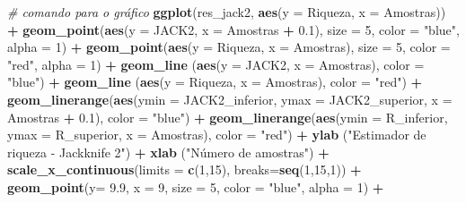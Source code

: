 \documentclass[
]{book}
\newenvironment{Shaded}{\begin{snugshade}}{\end{snugshade}}
\newcommand{\CommentTok}[1]{\textcolor[rgb]{0.56,0.35,0.01}{\textit{#1}}}
\newcommand{\DataTypeTok}[1]{\textcolor[rgb]{0.13,0.29,0.53}{#1}}
\newcommand{\DecValTok}[1]{\textcolor[rgb]{0.00,0.00,0.81}{#1}}
\newcommand{\FloatTok}[1]{\textcolor[rgb]{0.00,0.00,0.81}{#1}}
\newcommand{\KeywordTok}[1]{\textcolor[rgb]{0.13,0.29,0.53}{\textbf{#1}}}
\newcommand{\NormalTok}[1]{#1}
\newcommand{\OperatorTok}[1]{\textcolor[rgb]{0.81,0.36,0.00}{\textbf{#1}}}
\newcommand{\StringTok}[1]{\textcolor[rgb]{0.31,0.60,0.02}{#1}}
\begin{document}
\begin{Shaded}
\begin{Highlighting}[]
\CommentTok{# comando para o gráfico}
\KeywordTok{ggplot}\NormalTok{(res_jack2, }\KeywordTok{aes}\NormalTok{(}\DataTypeTok{y =}\NormalTok{ Riqueza, }\DataTypeTok{x =}\NormalTok{ Amostras)) }\OperatorTok{+}
\StringTok{  }\KeywordTok{geom_point}\NormalTok{(}\KeywordTok{aes}\NormalTok{(}\DataTypeTok{y =}\NormalTok{ JACK2, }\DataTypeTok{x =}\NormalTok{ Amostras }\OperatorTok{+}\StringTok{ }\FloatTok{0.1}\NormalTok{), }\DataTypeTok{size =} \DecValTok{5}\NormalTok{, }\DataTypeTok{color =} \StringTok{"blue"}\NormalTok{, }\DataTypeTok{alpha =} \DecValTok{1}\NormalTok{) }\OperatorTok{+}
\StringTok{  }\KeywordTok{geom_point}\NormalTok{(}\KeywordTok{aes}\NormalTok{(}\DataTypeTok{y =}\NormalTok{ Riqueza, }\DataTypeTok{x =}\NormalTok{ Amostras), }\DataTypeTok{size =} \DecValTok{5}\NormalTok{, }\DataTypeTok{color =} \StringTok{"red"}\NormalTok{, }\DataTypeTok{alpha =} \DecValTok{1}\NormalTok{) }\OperatorTok{+}
\StringTok{  }\KeywordTok{geom_line}\NormalTok{ (}\KeywordTok{aes}\NormalTok{(}\DataTypeTok{y =}\NormalTok{ JACK2, }\DataTypeTok{x =}\NormalTok{ Amostras), }\DataTypeTok{color =} \StringTok{"blue"}\NormalTok{) }\OperatorTok{+}
\StringTok{  }\KeywordTok{geom_line}\NormalTok{ (}\KeywordTok{aes}\NormalTok{(}\DataTypeTok{y =}\NormalTok{ Riqueza, }\DataTypeTok{x =}\NormalTok{ Amostras), }\DataTypeTok{color =} \StringTok{"red"}\NormalTok{) }\OperatorTok{+}
\StringTok{  }\KeywordTok{geom_linerange}\NormalTok{(}\KeywordTok{aes}\NormalTok{(}\DataTypeTok{ymin =}\NormalTok{ JACK2_inferior, }\DataTypeTok{ymax =}\NormalTok{ JACK2_superior, }\DataTypeTok{x =}\NormalTok{ Amostras }\OperatorTok{+}\StringTok{ }\FloatTok{0.1}\NormalTok{),}
 \DataTypeTok{color =} \StringTok{"blue"}\NormalTok{) }\OperatorTok{+}
\StringTok{  }\KeywordTok{geom_linerange}\NormalTok{(}\KeywordTok{aes}\NormalTok{(}\DataTypeTok{ymin =}\NormalTok{ R_inferior, }\DataTypeTok{ymax =}\NormalTok{ R_superior, }\DataTypeTok{x =}\NormalTok{ Amostras), }\DataTypeTok{color =} \StringTok{"red"}\NormalTok{) }\OperatorTok{+}
\StringTok{  }\KeywordTok{ylab}\NormalTok{ (}\StringTok{"Estimador de riqueza - Jackknife 2"}\NormalTok{) }\OperatorTok{+}
\StringTok{  }\KeywordTok{xlab}\NormalTok{ (}\StringTok{"Número de amostras"}\NormalTok{) }\OperatorTok{+}
\StringTok{  }\KeywordTok{scale_x_continuous}\NormalTok{(}\DataTypeTok{limits =} \KeywordTok{c}\NormalTok{(}\DecValTok{1}\NormalTok{,}\DecValTok{15}\NormalTok{), }\DataTypeTok{breaks=}\KeywordTok{seq}\NormalTok{(}\DecValTok{1}\NormalTok{,}\DecValTok{15}\NormalTok{,}\DecValTok{1}\NormalTok{)) }\OperatorTok{+}
\StringTok{  }\KeywordTok{geom_point}\NormalTok{(}\DataTypeTok{y=} \FloatTok{9.9}\NormalTok{, }\DataTypeTok{x =} \DecValTok{9}\NormalTok{, }\DataTypeTok{size =} \DecValTok{5}\NormalTok{, }\DataTypeTok{color =} \StringTok{"blue"}\NormalTok{, }\DataTypeTok{alpha =} \DecValTok{1}\NormalTok{) }\OperatorTok{+}\StringTok{ }

\end{Highlighting}
\end{Shaded}
\end{document}
